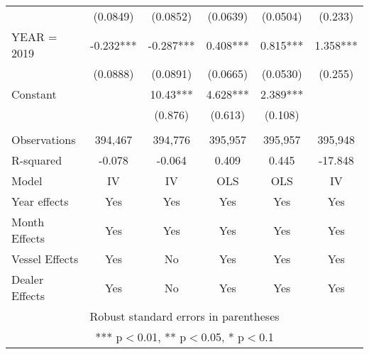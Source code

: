 \begin{tabular}{lccccc}
 & (0.0849) & (0.0852) & (0.0639) & (0.0504) & (0.233) \\
YEAR = 2019 & -0.232*** & -0.287*** & 0.408*** & 0.815*** & 1.358*** \\
 & (0.0888) & (0.0891) & (0.0665) & (0.0530) & (0.255) \\
Constant &  & 10.43*** & 4.628*** & 2.389*** &  \\
 &  & (0.876) & (0.613) & (0.108) &  \\
 &  &  &  &  &  \\
Observations & 394,467 & 394,776 & 395,957 & 395,957 & 395,948 \\
R-squared & -0.078 & -0.064 & 0.409 & 0.445 & -17.848 \\
Model & IV & IV & OLS & OLS & IV \\
Year effects & Yes & Yes & Yes & Yes & Yes \\
Month Effects & Yes & Yes & Yes & Yes & Yes \\
Vessel Effects & Yes & No & Yes & Yes & Yes \\
 Dealer Effects & Yes & No & Yes & Yes & Yes \\ \hline
\multicolumn{6}{c}{ Robust standard errors in parentheses} \\
\multicolumn{6}{c}{ *** p$<$0.01, ** p$<$0.05, * p$<$0.1} \\
\end{tabular}
